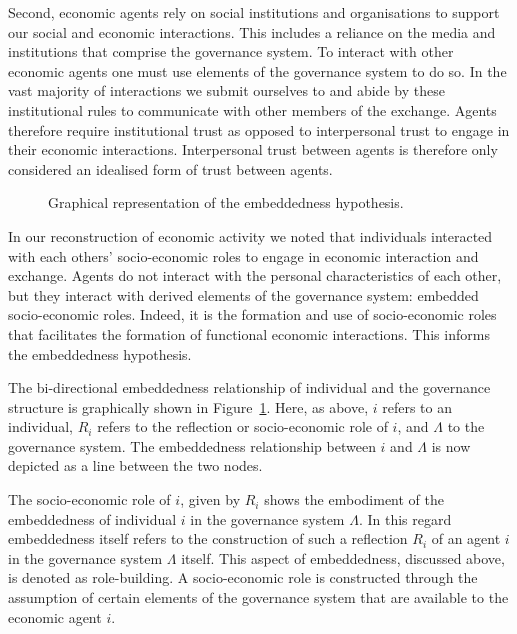 \begin{subappendices}
Second, economic agents rely on social institutions and organisations to support our social and economic interactions. This includes a reliance on the media and institutions that comprise the governance system. To interact with other economic agents one must use elements of the governance system to do so. In the vast majority of interactions we submit ourselves to and abide by these institutional rules to communicate with other members of the exchange. Agents therefore require institutional trust as opposed to interpersonal trust to engage in their economic interactions. Interpersonal trust between agents is therefore only considered an idealised form of trust between agents.

\begin{figure}[h]
\label{Pic:tripolar}
\begin{center}
\end{center}
\caption[Graphical representation of the embeddedness hypothesis]{Graphical representation of the embeddedness hypothesis.}
\end{figure}

In our reconstruction of economic activity we noted that individuals interacted with each others' socio-economic roles to engage in economic interaction and exchange. Agents do not interact with the personal characteristics of each other, but they interact with derived elements of the governance system: embedded socio-economic roles. Indeed, it is the formation and use of socio-economic roles that facilitates the formation of functional economic interactions. This informs the embeddedness hypothesis.

The bi-directional embeddedness relationship of individual and the governance structure is graphically shown in Figure~\ref{Pic:tripolar}. Here, as above, $i$ refers to an individual, $R_{i}$ refers to the reflection or socio-economic role of $i$, and $\Lambda$ to the governance system. The embeddedness relationship between $i$ and $\Lambda$ is now depicted as a line between the two nodes.

The socio-economic role of $i$, given by $R_{i}$ shows the embodiment of the embeddedness of individual $i$ in the governance system $\Lambda$. In this regard embeddedness itself refers to the construction of such a reflection $R_{i}$ of an agent $i$ in the governance system $\Lambda$ itself. This aspect of embeddedness, discussed above, is denoted as role-building. A socio-economic role is constructed through the assumption of certain elements of the governance system that are available to the economic agent $i$.


\end{subappendices}
